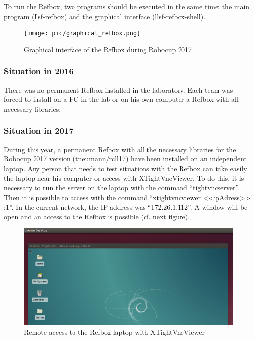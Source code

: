To run the Refbox, two programs should be executed in the same time: the main program (llsf-refbox) and the graphical interface (llsf-refbox-shell).

\begin{figure}[!h]
\centering
\texttt{[image: pic/graphical\_refbox.png]}
\caption{Graphical interface of the Refbox during Robocup 2017}
\label{fig:graphicalRefbox}
\end{figure}

\subsubsection{Situation in 2016}

There was no permanent Refbox installed in the laboratory. Each team was forced to install on a PC in the lab or on his own computer a Refbox with all necessary libraries. \\


\subsubsection{Situation in 2017}

During this year, a permanent Refbox with all the necessary libraries for the Robocup 2017 version (tneumann/rcll17) have been installed on an independent laptop. Any person that needs to test situations with the Refbox can take easily the laptop near his computer or access with XTightVncViewer.  To do this, it is necessary to run the server on the laptop with the command “tightvncserver”. Then it is possible to access with the command “xtightvncviewer <<ipAdress>> :1”.  In the current network, the IP address was “172.26.1.112”.
A window will be open and an access to the Refbox is possible (cf. next figure).\\

\begin{figure}[!h]
\centering
\includegraphics[width=\linewidth]{pic/xtightvncviewer.png}
\caption{Remote access to the Refbox laptop with XTightVncViewer}
\label{fig:xtightvncviewer}
\end{figure}

